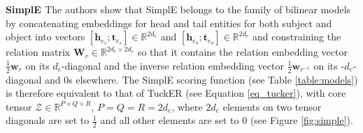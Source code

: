 \documentclass[11pt,a4paper]{article}
\newcommand{\keypoint}[1]{\vspace{0.1cm}\noindent\textbf{#1}\quad}
\begin{document}
\keypoint{SimplE \cite{kazemi2018simple}} The authors show that SimplE belongs to the family of bilinear models by concatenating embeddings for head and tail entities for both subject and object into vectors $[\mathbf{h}_{e_s};\mathbf{t}_{e_s}] \in \mathbb{R}^{2d_e}$ and $[\mathbf{h}_{e_o};\mathbf{t}_{e_o}] \in \mathbb{R}^{2d_e}$ and constraining the relation matrix $\mathbf{W}_r \in \mathbb{R}^{2d_e \times 2d_e}$ so that it contains the relation embedding vector $\frac{1}{2}\mathbf{w}_r$ on its $d_e$-diagonal and the inverse relation embedding vector $\frac{1}{2}\mathbf{w}_{r^{-1}}$ on its -$d_e$-diagonal and 0s elsewhere. The SimplE scoring function (see Table \ref{table:models}) is therefore equivalent to that of TuckER (see Equation \ref{eq_tucker}), with core tensor $\mathcal{Z} \in \mathbb{R}^{P \times Q \times R}$, $P=Q=R=2d_e$, where $2d_e$ elements on two tensor diagonals are set to $\frac{1}{2}$ and all other elements are set to 0 (see Figure \ref{fig:simple}).
\end{document}

